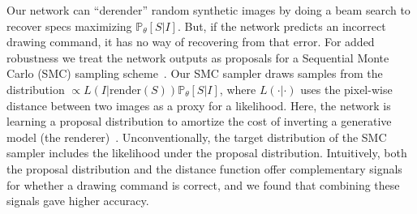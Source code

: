 \documentclass{article}
\newcommand{\probability}{\mathds{P}} %
\theoremstyle{definition}
\begin{document}
Our network can ``derender'' random synthetic images
by doing a beam search to
recover  specs maximizing $\probability_\theta[S|I]$. %
 But, if the network predicts an incorrect
drawing command, it has no way of recovering from that error.  
For added robustness %
we treat the
 network outputs as proposals for a Sequential Monte Carlo (SMC) sampling scheme~\citep{SMCBook}.
Our SMC sampler draws samples
from the distribution $\propto L(I|\text{render}(S))
\probability_\theta[S|I]$, where $L(\cdot | \cdot)$
uses the pixel-wise distance between two images as a proxy for a
likelihood.
Here, the network is learning a proposal distribution to amortize the cost of inverting a generative model (the renderer)~\citep{paige2016inference}.
Unconventionally, the target distribution of the SMC sampler
includes the likelihood under the proposal distribution.
Intuitively, both the proposal
distribution and the distance function offer complementary signals for
whether a drawing command is correct,
and we found that combining these signals gave higher accuracy.
\end{document}
